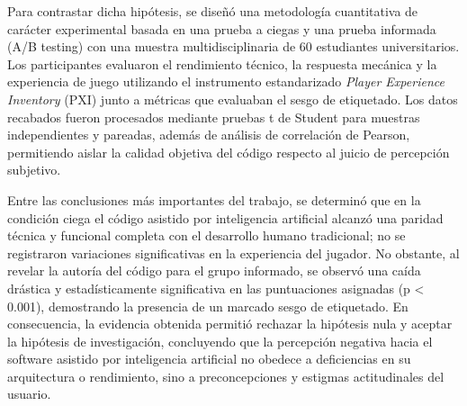 Para contrastar dicha hipótesis, se diseñó una metodología cuantitativa de carácter experimental basada en una prueba a ciegas y una prueba informada (A/B testing) con una muestra multidisciplinaria de 60 estudiantes universitarios. Los participantes evaluaron el rendimiento técnico, la respuesta mecánica y la experiencia de juego utilizando el instrumento estandarizado \textit{Player Experience Inventory} (PXI) junto a métricas que evaluaban el sesgo de etiquetado. Los datos recabados fueron procesados mediante pruebas t de Student para muestras independientes y pareadas, además de análisis de correlación de Pearson, permitiendo aislar la calidad objetiva del código respecto al juicio de percepción subjetivo.

Entre las conclusiones más importantes del trabajo, se determinó que en la condición ciega el código asistido por inteligencia artificial alcanzó una paridad técnica y funcional completa con el desarrollo humano tradicional; no se registraron variaciones significativas en la experiencia del jugador. No obstante, al revelar la autoría del código para el grupo informado, se observó una caída drástica y estadísticamente significativa en las puntuaciones asignadas (p < 0.001), demostrando la presencia de un marcado sesgo de etiquetado. En consecuencia, la evidencia obtenida permitió rechazar la hipótesis nula y aceptar la hipótesis de investigación, concluyendo que la percepción negativa hacia el software asistido por inteligencia artificial no obedece a deficiencias en su arquitectura o rendimiento, sino a preconcepciones y estigmas actitudinales del usuario. 